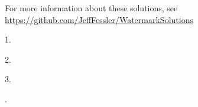 \documentclass{article}
\begin{document}
\thispagestyle{fancy}


\vspace*{3em}
For more information about these solutions,
see
\url{https://github.com/JeffFessler/WatermarkSolutions}

\vspace*{3em}
1.
\blindtext

\vspace*{3em}
2.
\textcolor{green}{\blindtext}

\vspace*{3em}
3.
\Blindtext


.
\colorbox{lightblue}{\parbox{\linewidth}{\Blindtext}}
\end{document}

